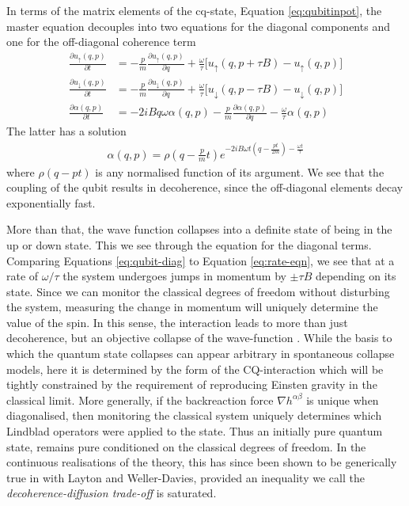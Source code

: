 \documentclass[aps,pra,showpacs,citeautoscript,amsmath,amssymb,floatfix,superscriptaddress,bbm, verbatim,amsfonts,changes,11pt,nofootinbib,longbibliography]{revtex4-2}
\def\u{u}
\def\ab{^{\alpha\beta}}
\def\down{\downarrow}
\def\up{\uparrow}
\begin{document}
In terms of the matrix elements of the cq-state, Equation \eqref{eq:qubitinpot}, the master equation decouples into two equations for the diagonal components and one for  the off-diagonal coherence term
\begin{align}
\frac{\partial\u_\up(q,p)}{\partial t} & =-\frac{p}{m} 
 \frac{\partial\u_\up(q,p)}{\partial q}
 +\frac{\omega}{\tau}\big[
 \u_\up(q,p+\tau B)-\u_\up(q,p)\big]
\nonumber\\
 \frac{\partial\u_\down(q,p)}{\partial t} & =-\frac{p}{m} 
 \frac{\partial\u_\down(q,p)}{\partial q}
 +\frac{\omega}{\tau}\big[
 \u_\down(q,p-\tau B)-\u_\down(q,p)\big] 
  \label{eq:qubit-diag}\\
 \frac{\partial\alpha(q,p)}{\partial t} &=
-2iBq\omega\alpha(q,p) 
 -\frac{p}{m} 
 \frac{\partial\alpha(q,p)}{\partial q}
 -\frac{\omega}{\tau}\alpha(q,p)
 \label{eq:qubit-offdiags}
\end{align}
The latter has a solution
\begin{align}
\alpha(q,p)=\rho(q-\frac{p}{m}t)e^{-2iB\omega t(q-\frac{pt}{2m}) -\frac{\omega t}{\tau}}
\end{align}
where $\rho(q-pt)$ is any normalised function of its argument. We see that the coupling of the qubit results in decoherence, since the off-diagonal elements decay exponentially fast. 

More than that, the wave function collapses into a definite state of being in the up or down state.
This we see through the equation for the diagonal terms. Comparing Equations \eqref{eq:qubit-diag} to Equation \eqref{eq:rate-eqn}, we see that at a rate of $\omega/\tau$ the system undergoes jumps in momentum by $\pm\tau B$ depending on its state.  Since we can monitor the classical degrees of freedom without disturbing the system, measuring the change in momentum will uniquely determine the value of the spin. In this sense, the interaction leads to more than just decoherence, but an objective collapse of the wave-function \cite{shimony1990desiderata,sep-qm-collapse}. 
While the basis to which the quantum state collapses can appear arbitrary in spontaneous collapse models, here it is determined by the form of the CQ-interaction which will be tightly constrained by the requirement of reproducing Einsten gravity in the classical limit. More generally, if the backreaction force $\nabla h\ab$ %
is unique when  diagonalised, then monitoring the classical system uniquely determines which Lindblad operators were applied to the state. Thus an initially pure quantum state, remains pure conditioned on the classical degrees of freedom. In the continuous realisations of the theory, this has since been shown to be generically true in  \cite{layton2022semi} with Layton and Weller-Davies, provided an inequality we call the {\it decoherence-diffusion trade-off} is saturated.\label{ft:unique}
\end{document}
